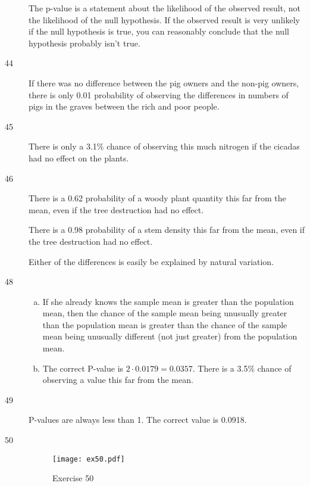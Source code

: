\documentclass[letterpaper, landscape]{exam}
\begin{document}
\begin{description}
        The p-value is a statement about the likelihood of the observed result,
        not the likelihood of the null hypothesis. If the observed result is
        very unlikely if the null hypothesis is true, you can reasonably
        conclude that the null hypothesis probably isn't true.

      \item[44] If there was no difference between the pig owners and the
        non-pig owners, there is only 0.01 probability of observing the
        differences in numbers of pigs in the graves between the rich and poor
        people.

      \item[45] There is only a 3.1\% chance of observing this much nitrogen if
        the cicadas had no effect on the plants.

      \item[46] There is a 0.62 probability of a woody plant quantity this far
        from the mean, even if the tree destruction had no effect.

        There is a 0.98 probability of a stem density this far from the mean, even
        if the tree destruction had no effect.

        Either of the differences is easily be explained by natural variation.

      \item[48] 
        \begin{enumerate}[(a)]
          \item If she already knows the sample mean is greater than the
            population mean, then the chance of the sample mean being unusually
            greater than the population mean is greater than the chance of the
            sample mean being unusually different (not just greater) from the
            population mean.

          \item The correct P-value is $2 \cdot 0.0179 = 0.0357$. There is a
            3.5\% chance of observing a value this far from the mean.

        \end{enumerate}

      \item[49] P-values are always less than 1. The correct value is 0.0918.

      \item[50]
        \begin{figure}[H]
          \centering
          \texttt{[image: ex50.pdf]}
          \caption{Exercise 50}
          \label{fig:ex50}
        \end{figure}


\end{description}
\end{document}

